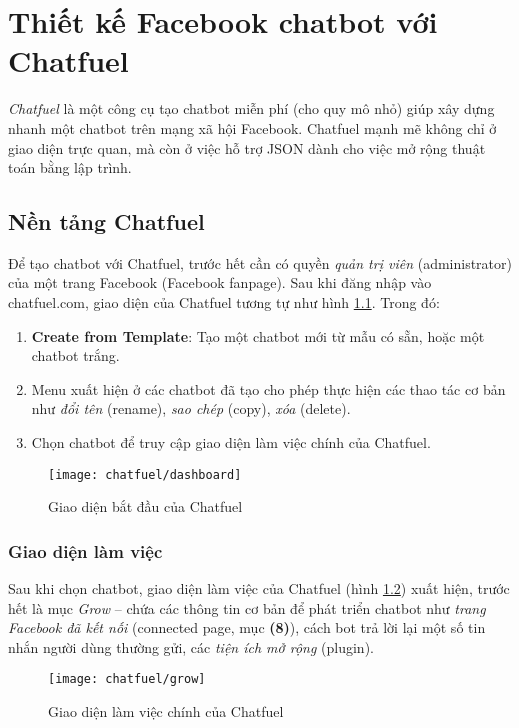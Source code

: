\chapter{Thiết kế Facebook chatbot với Chatfuel}
\textit{Chatfuel} là một công cụ tạo chatbot miễn phí (cho quy mô nhỏ) giúp xây dựng nhanh một chatbot trên mạng xã hội Facebook. Chatfuel mạnh mẽ không chỉ ở giao diện trực quan, mà còn ở việc hỗ trợ JSON dành cho việc mở rộng thuật toán bằng lập trình.\par

\section{Nền tảng Chatfuel}
Để tạo chatbot với Chatfuel, trước hết cần có quyền \textit{quản trị viên} (administrator) của một trang Facebook (Facebook fanpage). Sau khi đăng nhập vào {\color{mTeal}chatfuel.com}, giao diện của Chatfuel tương tự như hình \ref{fig:fig-c3-dashboard}. Trong đó:
\begin{enumerate}[label=\textbf{(\arabic*)},align=left,left=0cm..0cm,itemindent=*]
	\item \textbf{Create from Template}: Tạo một chatbot mới từ mẫu có sẵn, hoặc một chatbot trắng.
	\item Menu xuất hiện ở các chatbot đã tạo cho phép thực hiện các thao tác cơ bản như \textit{đổi tên} (rename), \textit{sao chép} (copy), \textit{xóa} (delete).
	\item Chọn chatbot để truy cập giao diện làm việc chính của Chatfuel.
\end{enumerate}\par

\begin{figure}[htb!]\centering
	\texttt{[image: chatfuel/dashboard]}
	\caption{Giao diện bắt đầu của Chatfuel}
	\label{fig:fig-c3-dashboard}
\end{figure}\par

\subsection{Giao diện làm việc}
Sau khi chọn chatbot, giao diện làm việc của Chatfuel (hình \ref{fig:fig-c3-grow}) xuất hiện, trước hết là mục \textit{Grow} – chứa các thông tin cơ bản để phát triển chatbot như \textit{trang Facebook đã kết nối} (connected page, mục \textbf{(8)}), cách bot trả lời lại một số tin nhắn người dùng thường gửi, các \textit{tiện ích mở rộng} (plugin).\par
\begin{figure}[htb!]\centering
	\texttt{[image: chatfuel/grow]}
	\caption{Giao diện làm việc chính của Chatfuel}
	\label{fig:fig-c3-grow}
\end{figure}\par

